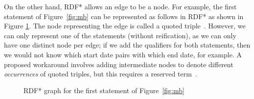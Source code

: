 On the other hand, RDF* allows an edge to be a node. For example, the first statement of Figure~\ref{fig:mb} can be represented as follows in RDF* as shown in Figure \ref{fig:rdf*}. The node representing the edge is called a quoted triple~\cite{Hartig21}.
However, we can only represent one of the statements (without reification), as we can only have one distinct node per edge; if we add the qualifiers for both statements, then we would not know which start date pairs with which end date, for example. A proposed workaround involves adding intermediate nodes to denote different \textit{occurrences} of quoted triples, but this requires a reserved term~\cite{Hartig21}.


\begin{figure}[tb]
\setlength{\vgap}{0.8cm}
\setlength{\hgap}{1.9cm}
\centering
{}
\caption{RDF* graph for the first statement of Figure~\ref{fig:mb} \label{fig:rdf*}}
\end{figure}

